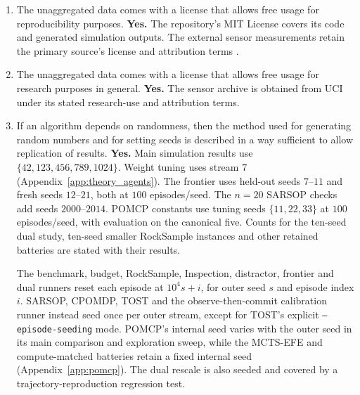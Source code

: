 \documentclass[manuscript, screen, review]{jair}
\begin{document}
\begin{enumerate}
{Other simulation trajectories can be regenerated using the recorded environment and README command map. Core, Tileworld, Inspection, scaling, discount and navigation summaries carry seed, episode, revision and timestamp provenance. RockSample records seeds and episode counts. Offline-reference and calibration protocols are stated in the text, while the MCTS ablation and POMCP sweep carry full provenance. Relevant summaries include seed-level SEs and Welch/Holm companions. Complete episode-level simulation records are not available for every retained battery. Long-term preservation beyond the versioned repository is not established.\par}
\item The unaggregated data comes with a license that allows free usage for reproducibility purposes. \textbf{Yes.} The repository's MIT License covers its code and generated simulation outputs. The external sensor measurements retain the primary source's license and attribution terms \citep{vergara2012data}.
\item The unaggregated data comes with a license that allows free usage for research purposes in general. \textbf{Yes.} The sensor archive is obtained from UCI under its stated research-use and attribution terms.
\item If an algorithm depends on randomness, then the method used for generating random numbers and for setting seeds is described in a way sufficient to allow replication of results. \textbf{Yes.} Main simulation results use $\{42,123,456,789,1024\}$. Weight tuning uses stream $7$ (Appendix~\ref{app:theory_agents}). The frontier uses held-out seeds $7$--$11$ and fresh seeds $12$--$21$, both at $100$ episodes/seed. The $n{=}20$ SARSOP checks add seeds $2000$--$2014$. POMCP constants use tuning seeds $\{11,22,33\}$ at $100$ episodes/seed, with evaluation on the canonical five. Counts for the ten-seed dual study, ten-seed smaller RockSample instances and other retained batteries are stated with their results.

The benchmark, budget, RockSample, Inspection, distractor, frontier and dual runners reset each episode at $10^4s+i$, for outer seed $s$ and episode index $i$. SARSOP, CPOMDP, TOST and the observe-then-commit calibration runner instead seed once per outer stream, except for TOST's explicit \texttt{--episode-seeding} mode. POMCP's internal seed varies with the outer seed in its main comparison and exploration sweep, while the MCTS-EFE and compute-matched batteries retain a fixed internal seed (Appendix~\ref{app:pomcp}). The dual rescale is also seeded and covered by a trajectory-reproduction regression test.


\end{enumerate}
\end{document}
